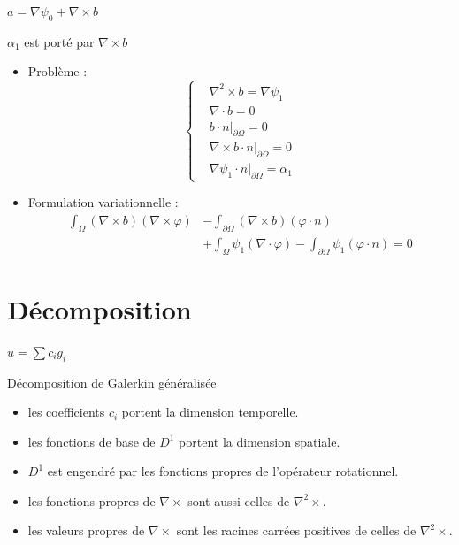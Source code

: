 \documentclass{beamer}
\newcommand{\grad}{{\nabla}}
\newcommand{\rot}{{\nabla\times}}
\newcommand{\rott}{{\nabla^2\times}}
\newcommand{\diverg}{{\nabla\cdot}}
\newcommand{\restr}{{\big\rvert_{\partial\Omega}}}
\begin{document}
\begin{frame}{$a=\grad\psi_0+\rot b$}
\begin{block}{$\alpha_1$ est porté par $\rot b$}
\begin{itemize}
\item Problème :
\[\left\{
\begin{aligned}
&\rott b = \grad\psi_1\\
&\diverg b = 0\\
&b\cdot n\restr = 0\\
&\rot b\cdot n\restr = 0\\
&\grad\psi_1\cdot n\restr = \alpha_1
\end{aligned}
\right.\]
\item Formulation variationnelle :
\begin{align*}
\int_\Omega (\rot b)(\rot\varphi) &- \int_{\partial\Omega} (\rot b)(\varphi\cdot n) \\
&+\int_\Omega \psi_1(\diverg\varphi) - \int_{\partial\Omega} \psi_1(\varphi\cdot n) = 0
\end{align*}
\end{itemize}
\end{block}
\end{frame}

\section{Décomposition}
\begin{frame}{$u=\sum c_ig_i$}
\begin{block}{Décomposition de Galerkin généralisée}
\begin{itemize}
\item les coefficients $c_i$ portent la dimension temporelle.
\item les fonctions de base de $D^1$ portent la dimension spatiale.
\item $D^1$ est engendré par les fonctions propres de l'opérateur rotationnel.
\item les fonctions propres de $\rot$ sont aussi celles de $\rott$.
\item les valeurs propres de $\rot$ sont les racines carrées positives de celles de $\rott$.
\end{itemize}
\end{block}
\end{frame}
\end{document}
